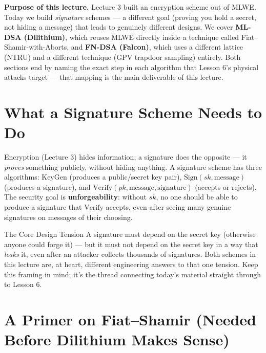 \begin{notebox}
\small\textbf{Purpose of this lecture.} Lecture 3 built an encryption scheme out of MLWE. Today we build \emph{signature} schemes --- a different goal (proving you hold a secret, not hiding a message) that leads to genuinely different designs. We cover \textbf{ML-DSA (Dilithium)}, which reuses MLWE directly inside a technique called Fiat--Shamir-with-Aborts, and \textbf{FN-DSA (Falcon)}, which uses a different lattice (NTRU) and a different technique (GPV trapdoor sampling) entirely. Both sections end by naming the exact step in each algorithm that Lesson 6's physical attacks target --- that mapping is the main deliverable of this lecture.
\end{notebox}

\section{What a Signature Scheme Needs to Do}
\label{sec:L4:what-a-signature-scheme-needs-to-do}

Encryption (Lecture 3) hides information; a signature does the opposite --- it \emph{proves} something publicly, without hiding anything. A signature scheme has three algorithms: $\mathrm{KeyGen}$ (produces a public/secret key pair), $\mathrm{Sign}(sk, \text{message})$ (produces a signature), and $\mathrm{Verify}(pk, \text{message}, \text{signature})$ (accepts or rejects). The security goal is \textbf{unforgeability}: without $sk$, no one should be able to produce a signature that $\mathrm{Verify}$ accepts, even after seeing many genuine signatures on messages of their choosing.

\begin{rmkbox}{The Core Design Tension}
A signature must depend on the secret key (otherwise anyone could forge it) --- but it must not depend on the secret key in a way that \emph{leaks} it, even after an attacker collects thousands of signatures. Both schemes in this lecture are, at heart, different engineering answers to that one tension. Keep this framing in mind; it's the thread connecting today's material straight through to Lesson 6.
\end{rmkbox}

\section{A Primer on Fiat--Shamir (Needed Before Dilithium Makes Sense)}
\label{sec:L4:a-primer-on-fiat-shamir-needed-before-di}

